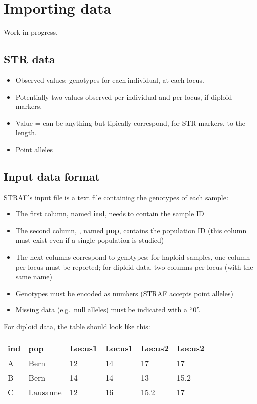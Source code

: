 \documentclass[
  a5paper]{book}
\providecommand{\tightlist}{%
  \setlength{\itemsep}{0pt}\setlength{\parskip}{0pt}}
\begin{document}
\hypertarget{importing-data}{%
\chapter{Importing data}\label{importing-data}}

Work in progress.

\hypertarget{str-data}{%
\section{STR data}\label{str-data}}

\begin{itemize}
\tightlist
\item
  Observed values: genotypes for each individual, at each locus.
\item
  Potentially two values observed per individual and per locus, if diploid markers.
\item
  Value = can be anything but tipically correspond, for STR markers, to the length.
\item
  Point alleles
\end{itemize}

\hypertarget{input-data-format}{%
\section{Input data format}\label{input-data-format}}

STRAF's input file is a text file containing the genotypes of each sample:

\begin{itemize}
\tightlist
\item
  The first column, named \textbf{ind}, needs to contain the sample ID
\item
  The second column, , named \textbf{pop}, contains the population ID (this column must exist even if a single population is studied)
\item
  The next columns correspond to genotypes: for haploid samples, one column per locus must be reported; for diploid data, two columns per locus (with the same name)
\item
  Genotypes must be encoded as numbers (STRAF accepts point alleles)
\item
  Missing data (e.g.~null alleles) must be indicated with a ``0''.
\end{itemize}

For diploid data, the table should look like this:

\begin{longtable}[]{@{}llllll@{}}
\toprule
ind & pop & Locus1 & Locus1 & Locus2 & Locus2\tabularnewline
\midrule
\endhead
A & Bern & 12 & 14 & 17 & 17\tabularnewline
B & Bern & 14 & 14 & 13 & 15.2\tabularnewline
C & Lausanne & 12 & 16 & 15.2 & 17\tabularnewline
\bottomrule
\end{longtable}
\end{document}
